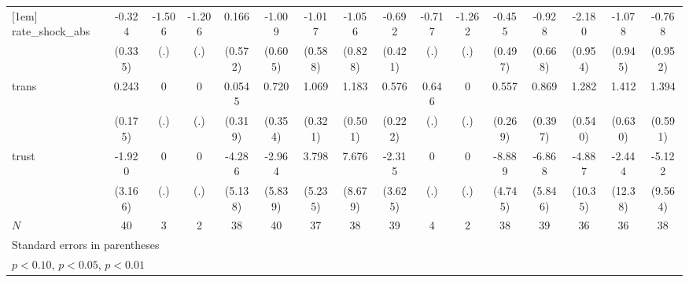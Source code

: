 {\begin{tabular}{l*{15}{c}}
[1em]
rate\_shock\_abs&      -0.324         &      -1.506         &      -1.206         &       0.166         &      -1.009         &      -1.017\sym{*}  &      -1.056         &      -0.692         &      -0.717         &      -1.262         &      -0.455         &      -0.928         &      -2.180\sym{**} &      -1.078         &      -0.768         \\
            &     (0.335)         &         (.)         &         (.)         &     (0.572)         &     (0.605)         &     (0.588)         &     (0.828)         &     (0.421)         &         (.)         &         (.)         &     (0.497)         &     (0.668)         &     (0.954)         &     (0.945)         &     (0.952)         \\
[1em]
trans       &       0.243         &           0         &           0         &      0.0545         &       0.720\sym{**} &       1.069\sym{***}&       1.183\sym{**} &       0.576\sym{**} &       0.646         &           0         &       0.557\sym{**} &       0.869\sym{**} &       1.282\sym{**} &       1.412\sym{**} &       1.394\sym{**} \\
            &     (0.175)         &         (.)         &         (.)         &     (0.319)         &     (0.354)         &     (0.321)         &     (0.501)         &     (0.222)         &         (.)         &         (.)         &     (0.269)         &     (0.397)         &     (0.540)         &     (0.630)         &     (0.591)         \\
[1em]
trust       &      -1.920         &           0         &           0         &      -4.286         &      -2.964         &       3.798         &       7.676         &      -2.315         &           0         &           0         &      -8.889\sym{*}  &      -6.868         &      -4.887         &      -2.444         &      -5.122         \\
            &     (3.166)         &         (.)         &         (.)         &     (5.138)         &     (5.839)         &     (5.235)         &     (8.679)         &     (3.625)         &         (.)         &         (.)         &     (4.745)         &     (5.846)         &     (10.35)         &     (12.38)         &     (9.564)         \\
\hline
\(N\)       &          40         &           3         &           2         &          38         &          40         &          37         &          38         &          39         &           4         &           2         &          38         &          39         &          36         &          36         &          38         \\
\hline\hline
\multicolumn{16}{l}{\footnotesize Standard errors in parentheses}\\
\multicolumn{16}{l}{\footnotesize \sym{*} \(p<0.10\), \sym{**} \(p<0.05\), \sym{***} \(p<0.01\)}\\
\end{tabular}
}
